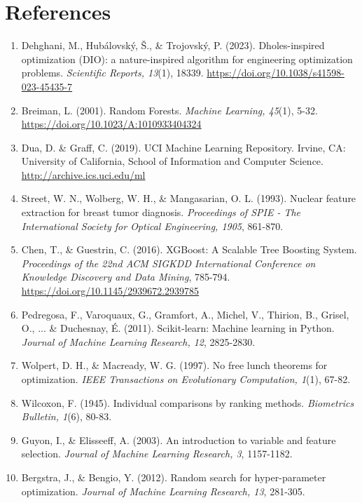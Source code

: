\documentclass[12pt, a4paper]{article}
\begin{document}
\section*{References}
\begin{enumerate}
    \item Dehghani, M., Hubálovský, Š., \& Trojovský, P. (2023). Dholes-inspired optimization (DIO): a nature-inspired algorithm for engineering optimization problems. \textit{Scientific Reports, 13}(1), 18339. \url{https://doi.org/10.1038/s41598-023-45435-7}
    
    \item Breiman, L. (2001). Random Forests. \textit{Machine Learning, 45}(1), 5-32. \url{https://doi.org/10.1023/A:1010933404324}
    
    \item Dua, D. \& Graff, C. (2019). UCI Machine Learning Repository. Irvine, CA: University of California, School of Information and Computer Science. \url{http://archive.ics.uci.edu/ml}
    
    \item Street, W. N., Wolberg, W. H., \& Mangasarian, O. L. (1993). Nuclear feature extraction for breast tumor diagnosis. \textit{Proceedings of SPIE - The International Society for Optical Engineering, 1905}, 861-870.
    
    \item Chen, T., \& Guestrin, C. (2016). XGBoost: A Scalable Tree Boosting System. \textit{Proceedings of the 22nd ACM SIGKDD International Conference on Knowledge Discovery and Data Mining}, 785-794. \url{https://doi.org/10.1145/2939672.2939785}
    
    \item Pedregosa, F., Varoquaux, G., Gramfort, A., Michel, V., Thirion, B., Grisel, O., ... \& Duchesnay, É. (2011). Scikit-learn: Machine learning in Python. \textit{Journal of Machine Learning Research, 12}, 2825-2830.
    
    \item Wolpert, D. H., \& Macready, W. G. (1997). No free lunch theorems for optimization. \textit{IEEE Transactions on Evolutionary Computation, 1}(1), 67-82.
    
    \item Wilcoxon, F. (1945). Individual comparisons by ranking methods. \textit{Biometrics Bulletin, 1}(6), 80-83.
    
    \item Guyon, I., \& Elisseeff, A. (2003). An introduction to variable and feature selection. \textit{Journal of Machine Learning Research, 3}, 1157-1182.
    
    \item Bergstra, J., \& Bengio, Y. (2012). Random search for hyper-parameter optimization. \textit{Journal of Machine Learning Research, 13}, 281-305.
\end{enumerate}
\end{document}
